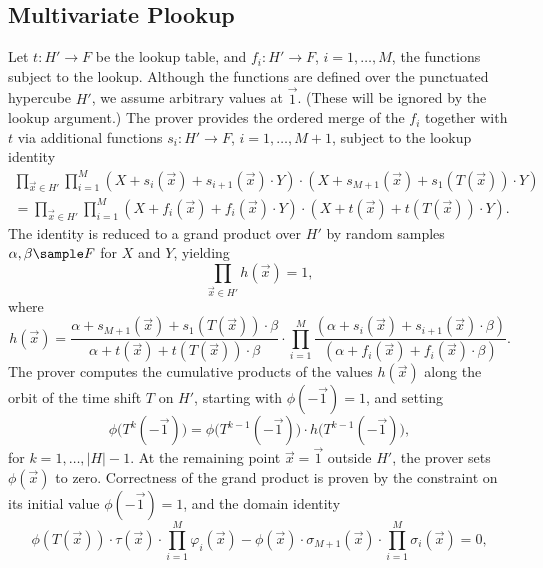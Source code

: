 \documentclass[11pt]{article}
\theoremstyle{definition}
\theoremstyle{definition}
\begin{document}
 

\subsection{Multivariate Plookup}
\label{s:hyperplonk:small}

Let $t: H'\rightarrow F$ be the lookup table, and $f_i:  H'\rightarrow F$, $i=1,\ldots,M$, the functions subject to the lookup.
Although the functions are defined over the punctuated hypercube $H'$, we assume arbitrary values at $\vec 1$.
(These will be ignored by the lookup argument.)
The prover provides the ordered merge of the $f_i$  together with $t$ via additional functions $s_i: H'\rightarrow F$, $i=1,\ldots, M+1$, subject to the  lookup identity
\begin{multline*}
\prod_{\vec x\in H'} \prod_{i=1}^{M} (X + s_{i}(\vec x) + s_{i+1}(\vec x)\cdot Y)\cdot (X + s_{M+1}(\vec x) + s_1(T(\vec x))\cdot Y)
\\
= \prod_{\vec x\in H'} \prod_{i=1}^{M} (X + f_i(\vec x) + f_i(\vec x)\cdot Y)\cdot (X + t(\vec x) + t(T(\vec x))\cdot Y).
\end{multline*}
The identity is reduced to a grand product over $H'$ by random samples $\alpha, \beta\sample F$ for $X$ and $Y$, yielding 
\[
\prod_{\vec x\in H'} h(\vec x) = 1,
\]
where 
\[
h(\vec x) = \frac{\alpha + s_{M+1}(\vec x) + s_1(T(\vec x))\cdot \beta}{\alpha + t(\vec x) + t(T(\vec x))\cdot \beta}\cdot 
\prod_{i=1}^M \frac{(\alpha + s_i(\vec x) + s_{i+1}(\vec x)\cdot \beta)}{
(\alpha + f_i(\vec x) + f_i(\vec x)\cdot \beta)}.
\]
The prover computes the cumulative products of the values $h(\vec x)$ along the orbit of the time shift $T$ on $H'$, starting with $\phi(-\vec 1) = 1$, and setting
\[
\phi\big(T^{k}(-\vec 1)\big) = \phi\big(T^{k-1}(-\vec 1)\big) \cdot h\big(T^{k-1}(-\vec 1)\big),
\]
for $k=1, \ldots, |H|-1$.
At the remaining point $\vec x = \vec 1$ outside $H'$, the prover sets $\phi(\vec x)$ to zero.
Correctness of the grand product is proven by the constraint on its initial value $\phi(-\vec 1) = 1$, and the domain identity
\begin{equation}
\phi(T( \vec x)) \cdot  \tau(\vec x)\cdot \prod_{i=1}^M  \varphi_{i}(\vec x) 
- \phi(\vec x)\cdot \sigma_{M+1}(\vec x)\cdot \prod_{i=1}^M \sigma_{i}(\vec x)
= 0, 
\end{equation}
\end{document}
